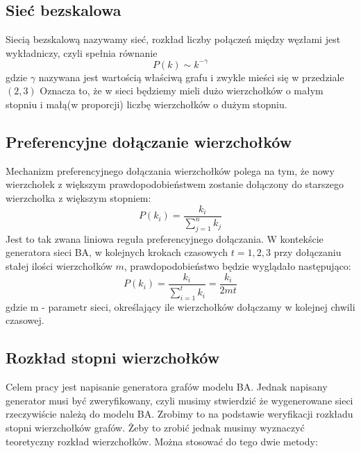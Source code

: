 \documentclass{article}
\begin{document}
\subsection{Sieć bezskalowa}
Siecią bezskalową nazywamy sieć, rozkład liczby połączeń między węzłami jest wykładniczy, czyli spełnia równanie 
	\begin{equation}
		P(k) \sim k^{-\gamma}
	\end{equation}
gdzie $\gamma$ nazywana jest wartością właściwą grafu i zwykle mieści się w przedziale $ (2,3)$  
Oznacza to, że w sieci będziemy mieli dużo wierzchołków o małym stopniu i małą(w proporcji) liczbę wierzchołków o dużym stopniu.
\subsection{Preferencyjne dołączanie wierzchołków}
Mechanizm preferencyjnego dołączania wierzchołków polega na tym, że nowy wierzchołek z większym prawdopodobieństwem zostanie dołączony do starszego wierzchołka z większym stopniem:
\begin{equation}
	P(k_i) = \frac{k_i}{ \sum_{ j = 1 }^{n} k_j }
\end{equation}
Jest to tak zwana liniowa reguła preferencyjnego dołączania. W kontekście generatora sieci BA, w kolejnych krokach czasowych $t = 1,2,3$ przy dołączaniu stałej ilości wierzchołków $m$, prawdopodobieństwo będzie wyglądało następująco:
\begin{equation}
	P(k_i) = \frac{k_i}{ \sum_{ i = 1 }^{t} k_i } = \frac{k_i} {2mt}
\end{equation}
	gdzie m - parametr sieci, określający ile wierzchołków dołączamy w kolejnej chwili czasowej.
\subsection{Rozkład stopni wierzchołków}
	Celem pracy jest napisanie generatora grafów modelu BA. Jednak napisany generator musi być zweryfikowany, czyli musimy stwierdzić że wygenerowane sieci rzeczywiście należą do modelu BA. Zrobimy to na podstawie weryfikacji rozkładu stopni wierzchołków grafów. Żeby to zrobić jednak musimy wyznaczyć teoretyczny rozkład wierzchołków. Można stosować do tego dwie metody:
\end{document}
